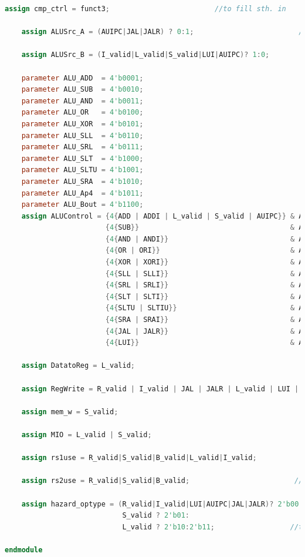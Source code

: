 \begin{lstlisting}[language = {verilog}]
    assign cmp_ctrl = funct3;                         //to fill sth. in 

    assign ALUSrc_A = (AUIPC|JAL|JALR) ? 0:1;                         //to fill sth. in 

    assign ALUSrc_B = (I_valid|L_valid|S_valid|LUI|AUIPC)? 1:0;                         //to fill sth. in 

    parameter ALU_ADD  = 4'b0001;
    parameter ALU_SUB  = 4'b0010;
    parameter ALU_AND  = 4'b0011;
    parameter ALU_OR   = 4'b0100;
    parameter ALU_XOR  = 4'b0101;
    parameter ALU_SLL  = 4'b0110;
    parameter ALU_SRL  = 4'b0111;
    parameter ALU_SLT  = 4'b1000;
    parameter ALU_SLTU = 4'b1001;
    parameter ALU_SRA  = 4'b1010;
    parameter ALU_Ap4  = 4'b1011;
    parameter ALU_Bout = 4'b1100;
    assign ALUControl = {4{ADD | ADDI | L_valid | S_valid | AUIPC}} & ALU_ADD  |
                        {4{SUB}}                                    & ALU_SUB  |
                        {4{AND | ANDI}}                             & ALU_AND  |
                        {4{OR | ORI}}                               & ALU_OR   |
                        {4{XOR | XORI}}                             & ALU_XOR  |
                        {4{SLL | SLLI}}                             & ALU_SLL  |
                        {4{SRL | SRLI}}                             & ALU_SRL  |
                        {4{SLT | SLTI}}                             & ALU_SLT  |
                        {4{SLTU | SLTIU}}                           & ALU_SLTU |
                        {4{SRA | SRAI}}                             & ALU_SRA  |
                        {4{JAL | JALR}}                             & ALU_Ap4  |
                        {4{LUI}}                                    & ALU_Bout ;

    assign DatatoReg = L_valid;

    assign RegWrite = R_valid | I_valid | JAL | JALR | L_valid | LUI | AUIPC;

    assign mem_w = S_valid;

    assign MIO = L_valid | S_valid;

    assign rs1use = R_valid|S_valid|B_valid|L_valid|I_valid;                        //to fill sth. in 

    assign rs2use = R_valid|S_valid|B_valid;                         //to fill sth. in 

    assign hazard_optype = (R_valid|I_valid|LUI|AUIPC|JAL|JALR)? 2'b00:
                            S_valid ? 2'b01:
                            L_valid ? 2'b10:2'b11;                  //to fill sth. in 

endmodule
\end{lstlisting}

